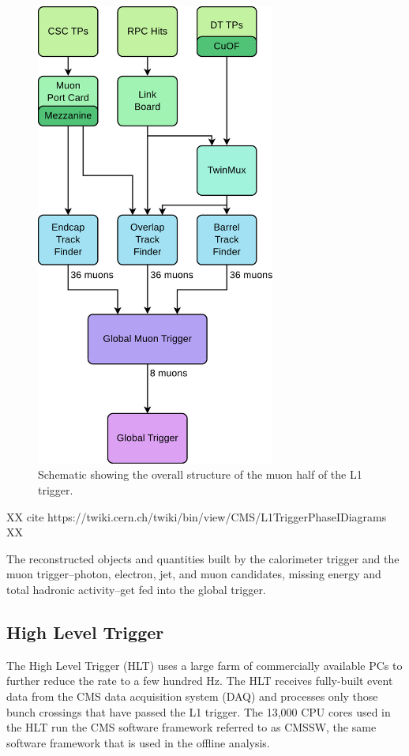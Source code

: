 \begin{figure}[h]
\begin{center}
\includegraphics[width=0.7\textwidth]{Figures/Trigger/muonL1T.pdf}
\end{center}
\caption{Schematic showing the overall structure of the muon half of the L1 trigger.}
\label{fig:muonL1T}
\end{figure}

XX cite https://twiki.cern.ch/twiki/bin/view/CMS/L1TriggerPhaseIDiagrams XX 

The reconstructed objects and quantities built by the calorimeter trigger and the muon trigger--photon, electron, jet, and muon candidates, missing energy and total hadronic activity--get fed into the global trigger. 

\subsection{High Level Trigger}
\label{HLT}
The High Level Trigger (HLT) uses a large farm of commercially available PCs to further reduce the rate to a few hundred Hz. The HLT receives fully-built event data from the CMS data acquisition system (DAQ) and processes only those bunch crossings that have passed the L1 trigger. The 13,000 CPU cores used in the HLT run the CMS software framework referred to as CMSSW, the same software framework that is used in the offline analysis. 

